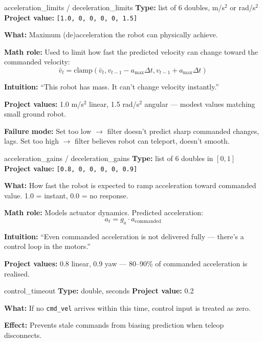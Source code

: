 \documentclass[11pt,a4paper]{article}
\begin{document}
\begin{paramcard}{acceleration\_limits / deceleration\_limits}
\textbf{Type:} list of 6 doubles, m/s$^2$ or rad/s$^2$ \quad \textbf{Project value:} \texttt{[1.0, 0, 0, 0, 0, 1.5]}

\textbf{What:} Maximum (de)acceleration the robot can physically achieve.

\textbf{Math role:} Used to limit how fast the predicted velocity can change toward the commanded velocity:
\[
\bar{v}_t = \mathrm{clamp}(\bar{v}_t, v_{t-1} - a_{\max}\Delta t, v_{t-1} + a_{\max}\Delta t)
\]

\textbf{Intuition:} ``This robot has mass. It can't change velocity instantly.''

\textbf{Project values:} 1.0 m/s$^2$ linear, 1.5 rad/s$^2$ angular --- modest values matching small ground robot.

\textbf{Failure mode:} Set too low $\to$ filter doesn't predict sharp commanded changes, lags. Set too high $\to$ filter believes robot can teleport, doesn't smooth.
\end{paramcard}

\begin{paramcard}{acceleration\_gains / deceleration\_gains}
\textbf{Type:} list of 6 doubles in $[0, 1]$ \quad \textbf{Project value:} \texttt{[0.8, 0, 0, 0, 0, 0.9]}

\textbf{What:} How fast the robot is expected to ramp acceleration toward commanded value. 1.0 = instant, 0.0 = no response.

\textbf{Math role:} Models actuator dynamics. Predicted acceleration:
\[
a_t = g_a \cdot a_{\text{commanded}}
\]

\textbf{Intuition:} ``Even commanded acceleration is not delivered fully --- there's a control loop in the motors.''

\textbf{Project values:} 0.8 linear, 0.9 yaw --- 80--90\% of commanded acceleration is realised.
\end{paramcard}

\begin{paramcard}{control\_timeout}
\textbf{Type:} double, seconds \quad \textbf{Project value:} 0.2

\textbf{What:} If no \texttt{cmd\_vel} arrives within this time, control input is treated as zero.

\textbf{Effect:} Prevents stale commands from biasing prediction when teleop disconnects.
\end{paramcard}

\end{document}
